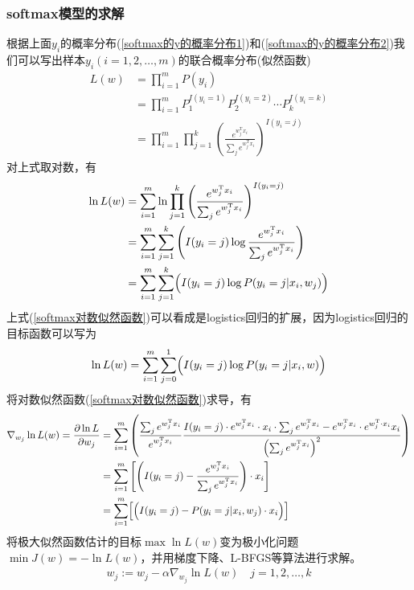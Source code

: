         \subsubsection{softmax模型的求解}
            \par
            根据上面$y_i$的概率分布(\ref{softmax的y的概率分布1})和(\ref{softmax的y的概率分布2})我们可以写出样本$y_i(i=1,2,\dots,m)$的联合概率分布(似然函数)
            \begin{align*}
            L(w) & = \prod _{i=1}^m P(y_i)\\
            & =\prod_{i=1}^m P_1^{I(y_i=1)}P_2^{I(y_i=2)}\cdots P_k^{I(y_i=k)}\\
            & = \prod_{i=1}^m\prod_{j=1}^k \left( \frac{e^{w_j^\mathrm{T}x_i}}{\sum_je^{w_j^\mathrm{T}x_i}} \right) ^{I(y_i=j)}
            \end{align*}
            对上式取对数，有
            \begin{align}
            \label{softmax对数似然函数}
            \ln L(w) &= \sum_{i=1}^m\ln \prod_{j=1}^k \left( \frac{e^{w_j^\mathrm{T}x_i}}{\sum_je^{w_j^\mathrm{T}x_i}} \right) ^{I(y_i=j)} \notag \\
            &=\sum_{i=1}^m\sum_{j=1}^k \left( I(y_i=j) \log \frac{e^{w_j^\mathrm{T}x_i}}{\sum_je^{w_j^\mathrm{T}x_i}} \right) \notag \\
            &=\sum_{i=1}^m\sum_{j=1}^k \Bigl(I(y_i=j) \log P(y_i = j|x_i,w_j) \Bigr)
            \end{align}
            上式(\ref{softmax对数似然函数})可以看成是logistics回归的扩展，因为logistics回归的目标函数可以写为
            \begin{align*}
            \ln L(w) = \sum_{i=1}^m\sum_{j=0}^1 \Bigl(I(y_i=j) \log P(y_i = j|x_i,w) \Bigr)
            \end{align*}
            将对数似然函数(\ref{softmax对数似然函数})求导，有
            \begin{align*}
            \nabla_{w_j} \ln L(w) = \frac{\partial \ln L}{\partial w_j} &= \sum_{i=1}^m \left( \frac{\sum_j e^{w_j^\mathrm{T}x_i} }{e^{w_j^\mathrm{T}x_i}}  \frac{I(y_i = j) \cdot e^{w_j^\mathrm{T}x_i} \cdot x_i \cdot \sum_je^{w_j^\mathrm{T}x_i} - e^{w_j^\mathrm{T}x_i} \cdot e^{w_j^\mathrm{T} \cdot x_i} x_i}{ \left( \sum_je^{w_j^\mathrm{T}x_i} \right)^2  }\right)\\
            &= \sum_{i=1}^m\left[ \left( I(y_i=j)-\frac{e^{w_j^\mathrm{T}x_i}}{\sum_j e^{w_j^\mathrm{T}x_i}} \right) \cdot x_i    \right]\\
            &=\sum_{i=1}^m \Bigl[\Bigl(I(y_i=j) - P(y_i=j|x_i,w_j) \cdot x_i\Bigr)\Bigr]
            \end{align*}
            将极大似然函数估计的目标$\max\ln L(w)$变为极小化问题$\min J(w) = -\ln L(w)$，并用梯度下降、L-BFGS等算法进行求解。
            \begin{align*}
            w_j:=w_j - \alpha \nabla_{w_j} \ln L(w) \quad j=1,2,\dots,k
            \end{align*}

